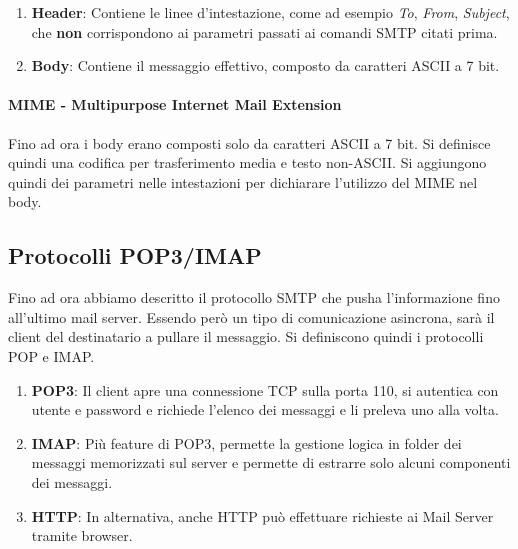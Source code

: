 \documentclass{article}
\begin{document}
\begin{enumerate}
    \item \textbf{Header}: Contiene le linee d'intestazione, come ad esempio \textit{To}, \textit{From}, \textit{Subject}, che \textbf{non} corrispondono ai parametri passati ai comandi SMTP citati prima. 
    \item \textbf{Body}: Contiene il messaggio effettivo, composto da caratteri ASCII a 7 bit.
\end{enumerate}

\paragraph{MIME - Multipurpose Internet Mail Extension} Fino ad ora i body erano composti solo da caratteri ASCII a 7 bit. Si definisce quindi una codifica per trasferimento media e testo non-ASCII.
Si aggiungono quindi dei parametri nelle intestazioni per dichiarare l'utilizzo del MIME nel body.

\subsection{Protocolli POP3/IMAP}

Fino ad ora abbiamo descritto il protocollo SMTP che pusha l'informazione fino all'ultimo mail server. Essendo però un tipo di comunicazione asincrona, sarà il client del destinatario a pullare il messaggio. Si definiscono quindi i protocolli
POP e IMAP.

\begin{enumerate}
    \item \textbf{POP3}: Il client apre una connessione TCP sulla porta 110, si autentica con utente e password e richiede l'elenco dei messaggi e li preleva uno alla volta.
    \item \textbf{IMAP}: Più feature di POP3, permette la gestione logica in folder dei messaggi memorizzati sul server e permette di estrarre solo alcuni componenti dei messaggi.
    \item \textbf{HTTP}: In alternativa, anche HTTP può effettuare richieste ai Mail Server tramite browser.
\end{enumerate}

\newpage

\end{document}
